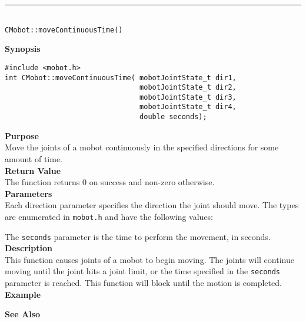 \noindent
\vspace{5pt}
\rule{4.5in}{0.015in}\\
\noindent
{\LARGE \texttt{CMobot::moveContinuousTime()}}\\
{}

\noindent
{\bf Synopsis}
\vspace{-8pt}
\begin{verbatim}
#include <mobot.h>
int CMobot::moveContinuousTime( mobotJointState_t dir1, 
                                mobotJointState_t dir2, 
                                mobotJointState_t dir3, 
                                mobotJointState_t dir4, 
                                double seconds);
\end{verbatim}

\noindent
{\bf Purpose}\\
Move the joints of a mobot continuously in the specified directions for some amount of time.\\

\noindent
{\bf Return Value}\\
The function returns 0 on success and non-zero otherwise.\\

\noindent
{\bf Parameters}\\
Each direction parameter specifies the direction the joint should move. The types
are enumerated in \texttt{mobot.h} and have the following values:

The \texttt{seconds} parameter is the time to perform the movement, in seconds.
\\

\noindent
{\bf Description}\\
This function causes joints of a mobot to begin moving. The joints will continue moving
until the joint hits a joint limit, or the time specified in the \texttt{seconds} parameter
is reached. This function will block until the motion is completed.\\

\noindent
{\bf Example}\\
\noindent

\noindent
{\bf See Also}\\

